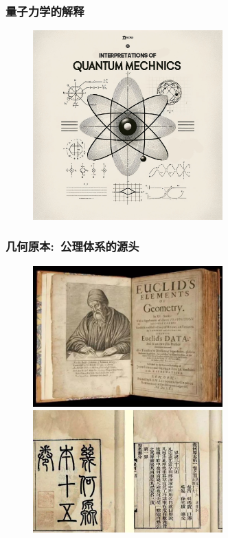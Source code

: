 \frame
{
	\frametitle{量子力学的解释}
\begin{figure}[h!]
\centering
\vspace{-12.5pt}
\includegraphics[height=0.745\textwidth,width=0.65\textwidth,viewport=300 150 1800 1870,clip]{Figures/Interpretation-QM.png}
\caption{\fontsize{5.2pt}{3.9pt}}
\label{Interpretation-QM}
\end{figure}
}

\frame
{
	\frametitle{几何原本:~公理体系的源头}
\begin{figure}[h!]
\centering
\vspace{-13pt}
\includegraphics[height=0.38\textwidth,width=0.65\textwidth,viewport=0 0 680 500,clip]{Figures/Element_Geometry_1.jpg}\\
\vspace{1pt}
\includegraphics[height=0.36\textwidth,width=0.65\textwidth,viewport=0 0 810 500,clip]{Figures/Element_Geometry_2.jpg}
\label{Element_Geometru}
\end{figure}
}

